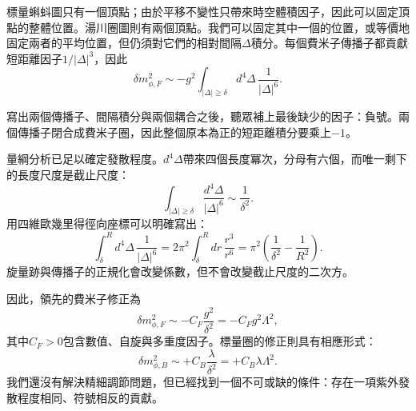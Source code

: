 標量蝌蚪圖只有一個頂點；由於平移不變性只帶來時空體積因子，因此可以固定頂點的整體位置。湯川圈圖則有兩個頂點。我們可以固定其中一個的位置，或等價地固定兩者的平均位置，但仍須對它們的相對間隔\(\Delta\)積分。每個費米子傳播子都貢獻短距離因子\(1/|\Delta|^3\)，因此
\begin{equation}
\delta m_{\phi,F}^2
\sim
-g^2\int_{|\Delta|\geq\delta}d^4\Delta\,
\frac{1}{|\Delta|^6}.
\end{equation}

寫出兩個傳播子、間隔積分與兩個耦合之後，聽眾補上最後缺少的因子：負號。兩個傳播子閉合成費米子圈，因此整個原本為正的短距離積分要乘上\(-1\)。

量綱分析已足以確定發散程度。\(d^4\Delta\)帶來四個長度冪次，分母有六個，而唯一剩下的長度尺度是截止尺度：
\begin{equation}
\int_{|\Delta|\geq\delta}
\frac{d^4\Delta}{|\Delta|^6}
\sim\frac{1}{\delta^2}.
\end{equation}
用四維歐幾里得徑向座標可以明確寫出：
\begin{equation}
\int_{\delta}^{R}d^4\Delta\,\frac{1}{|\Delta|^6}
=2\pi^2\int_{\delta}^{R}dr\,\frac{r^3}{r^6}
=\pi^2\left(\frac{1}{\delta^2}-\frac{1}{R^2}\right).
\end{equation}
旋量跡與傳播子的正規化會改變係數，但不會改變截止尺度的二次方。

\begin{classroomqa}
\end{classroomqa}

\begin{classroomqa}
\end{classroomqa}

因此，領先的費米子修正為
\begin{equation}
\delta m_{\phi,F}^2
\sim -C_F\frac{g^2}{\delta^2}
=-C_Fg^2\Lambda^2,
\end{equation}
其中\(C_F>0\)包含數值、自旋與多重度因子。標量圈的修正則具有相應形式：
\begin{equation}
\delta m_{\phi,B}^2
\sim+C_B\frac{\lambda}{\delta^2}
=+C_B\lambda\Lambda^2.
\end{equation}
我們還沒有解決精細調節問題，但已經找到一個不可或缺的條件：存在一項紫外發散程度相同、符號相反的貢獻。

